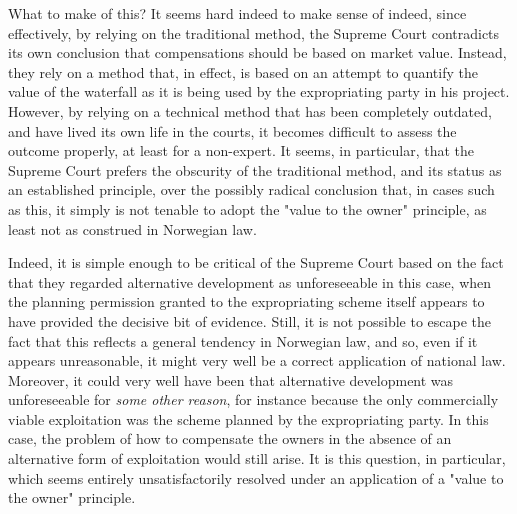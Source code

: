 What to make of this? It seems hard indeed to make sense of indeed, since effectively, by relying on the traditional method, the Supreme Court contradicts its own conclusion that compensations should be based on market value. Instead, they rely on a method that, in effect, is based on an attempt to quantify the value of the waterfall as it is being used by the expropriating party in his project. However, by relying on a technical method that has been completely outdated, and have lived its own life in the courts, it becomes difficult to assess the outcome properly, at least for a non-expert. It seems, in particular, that the Supreme Court prefers the obscurity of the traditional method, and its status as an established principle, over the possibly radical conclusion that, in cases such as this, it simply is not tenable to adopt the "value to the owner" principle, as least not as construed in Norwegian law.

Indeed, it is simple enough to be critical of the Supreme Court based on the fact that they regarded alternative development as unforeseeable in this case, when the planning permission granted to the expropriating scheme itself appears to have provided the decisive bit of evidence. Still, it is not possible to escape the fact that this reflects a general tendency in Norwegian law, and so, even if it appears unreasonable, it might very well be a correct application of national law. Moreover, it could very well have been that alternative development was unforeseeable for \emph{some other reason}, for instance because the only commercially viable exploitation was the scheme planned by the expropriating party. In this case, the problem of how to compensate the owners in the absence of an alternative form of exploitation would still arise. It is this question, in particular, which seems entirely unsatisfactorily resolved under an application of a "value to the owner" principle.

